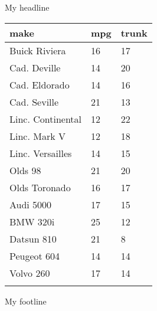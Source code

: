 \documentclass{article}
\begin{document}
\begin{center}
My headline
\end{center}
\begin{table}[h] \centering
{}

\begin{tabularx}{\textwidth}{lCC}

\toprule
{make}&{mpg}&{trunk} \tabularnewline
\midrule\addlinespace[1.5ex]
Buick Riviera&16&17 \tabularnewline
Cad. Deville&14&20 \tabularnewline
Cad. Eldorado&14&16 \tabularnewline
Cad. Seville&21&13 \tabularnewline
Linc. Continental&12&22 \tabularnewline
Linc. Mark V&12&18 \tabularnewline
Linc. Versailles&14&15 \tabularnewline
Olds 98&21&20 \tabularnewline
Olds Toronado&16&17 \tabularnewline
Audi 5000&17&15 \tabularnewline
BMW 320i&25&12 \tabularnewline
Datsun 810&21&8 \tabularnewline
Peugeot 604&14&14 \tabularnewline
Volvo 260&17&14 \tabularnewline
\bottomrule \addlinespace[1.5ex]

\end{tabularx}
\end{table}
My footline
\end{document}
